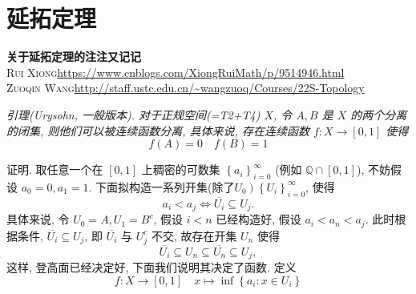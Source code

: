 \documentclass[options]{article}
\begin{document}
\newenvironment{remark}{
	\begin{center}
		\begin{minipage}{0.8\textwidth}\linespread{1.3}\selectfont\itshape}
			{\end{minipage}
	\end{center}
	\vspace*{4pt}}
\newenvironment{en}{}{\switchcolumn}
\newenvironment{cn}{\linespread{1.3}\selectfont}{\switchcolumn*}

\section{延拓定理}

\linespread{1.3}\selectfont
\begin{center}{\bf\Huge{关于延拓定理的注注又记记}}\\
	{{\scshape{Rui Xiong}}\quad\url{https://www.cnblogs.com/XiongRuiMath/p/9514946.html}\\ 
	{\scshape{Zuoqin Wang}}\quad\url{http://staff.ustc.edu.cn/\~wangzuoq/Courses/22S-Topology}}
\end{center}
\begin{remark}
	引理(Urysohn, 一般版本). 对于正规空间(=T2+T4) $X$, 令 $A, B$ 是 $X$ 的两个分离的闭集, 则他们可以被连续函数分离, 具体来说, 存在连续函数 $f: X \rightarrow[0,1]$ 使得
	\[
			f(A)=0 \quad f(B)=1
	\]
\end{remark}

证明. 取任意一个在 $[0,1]$ 上稠密的可数集 $\left\{a_i\right\}_{i=0}^{\infty}$ (例如 $\mathbb{Q} \cap[0,1]$), 不妨假设 $a_0=0, a_1=1$. 下面拟构造一系列开集(除了$\left.U_0\right)\left\{U_i\right\}_{i=0}^{\infty}$, 使得
\[
		a_i<a_j \Longleftrightarrow \overline{U_i} \subseteq U_j.
\]
具体来说, 令 $U_0=A, U_1=B^c$, 假设 $i<n$ 已经构造好, 假设 $a_i<a_n<a_j$. 此时根据条件, $\overline{U_i} \subseteq U_j$, 即 $\overline{U_i}$ 与 $U_j^c$ 不交, 故存在开集 $U_n$ 使得
\[
		\overline{U_i} \subseteq U_n \subseteq \overline{U_n} \subseteq U_j,
\]
这样, 登高面已经决定好, 下面我们说明其决定了函数. 定义
\[
		f: X \longrightarrow[0,1] \quad x \longmapsto \inf \left\{a_i: x \in U_i\right\}
\]
\end{document}
